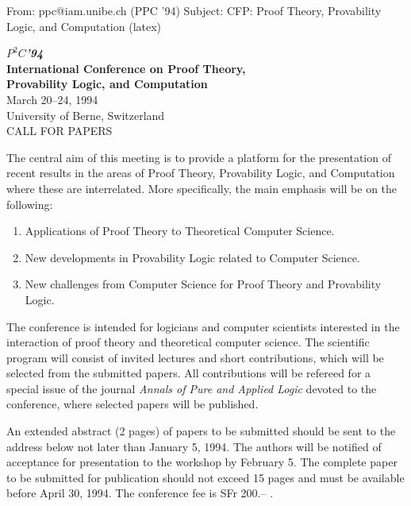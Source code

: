 From: ppc@iam.unibe.ch (PPC '94)
Subject: CFP: Proof Theory, Provability Logic, and Computation (latex)


\pagestyle{empty}
\oddsidemargin  -4.75mm
\evensidemargin -4.75mm
\marginparwidth 2cm
\marginparsep 0pt
\topmargin 0mm
\headheight 0pt
\headsep 0pt
\topskip 0pt        
\textheight 242mm
\textwidth 170mm
\parindent=0pt


\begin{center}
{\Huge {\boldmath $P^2 C$}{\it\bf '94}}\\[3ex]
{\LARGE\bf International Conference on Proof Theory,}\\[0.7ex]
{\LARGE\bf Provability Logic, and Computation}\\[3.0ex]
{\large March 20--24, 1994}\\
{\large University of Berne, Switzerland}\\[3ex]
{\Large CALL FOR PAPERS}
\end{center}

\bigskip
The central aim of this meeting is to provide a platform for the 
presentation of recent results in the areas of Proof Theory, 
Provability Logic, and Computation where these are interrelated.
More specifically, the main emphasis will be on the following: 
\begin{enumerate}
\item Applications of Proof Theory to Theoretical Computer Science.
\vspace*{-3mm}
\item New developments in Provability Logic related to Computer Science.
\vspace*{-3mm}
\item New challenges from Computer Science for Proof Theory and 
Provability Logic.
\end{enumerate}

The conference is intended for logicians and computer scientists 
interested in the interaction of proof theory
and theoretical computer science.  
The scientific program will consist of invited lectures and
short contributions, which will be selected
from the submitted papers.
All contributions will be refereed for a special issue of the journal 
{\em Annals of Pure and Applied Logic} devoted to the conference, 
where selected papers will be published.

\medskip
An extended abstract (2 pages) of papers to be submitted
should be sent to the address below
not later than January 5, 1994.
The authors will be notified of acceptance for presentation
to the workshop by February 5.
The  complete  paper to be submitted for publication 
should not exceed 15 pages and must be available before April 30, 1994.
The conference fee is SFr 200.-- .


